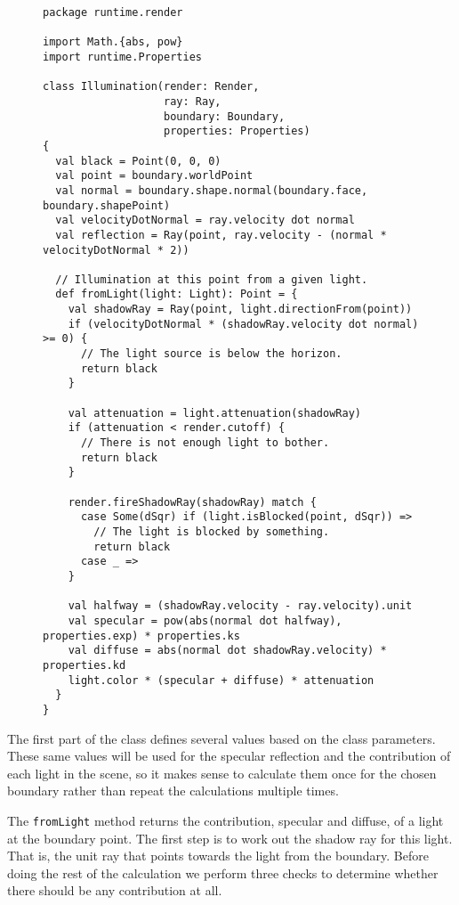 \begin{figure}
\begin{verbatim}
package runtime.render

import Math.{abs, pow}
import runtime.Properties

class Illumination(render: Render,
                   ray: Ray,
                   boundary: Boundary,
                   properties: Properties)
{
  val black = Point(0, 0, 0)
  val point = boundary.worldPoint
  val normal = boundary.shape.normal(boundary.face, boundary.shapePoint)
  val velocityDotNormal = ray.velocity dot normal
  val reflection = Ray(point, ray.velocity - (normal * velocityDotNormal * 2))

  // Illumination at this point from a given light.
  def fromLight(light: Light): Point = {
    val shadowRay = Ray(point, light.directionFrom(point))
    if (velocityDotNormal * (shadowRay.velocity dot normal) >= 0) {
      // The light source is below the horizon.
      return black
    }

    val attenuation = light.attenuation(shadowRay)
    if (attenuation < render.cutoff) {
      // There is not enough light to bother.
      return black
    }

    render.fireShadowRay(shadowRay) match {
      case Some(dSqr) if (light.isBlocked(point, dSqr)) =>
        // The light is blocked by something.
        return black
      case _ =>
    }

    val halfway = (shadowRay.velocity - ray.velocity).unit
    val specular = pow(abs(normal dot halfway), properties.exp) * properties.ks
    val diffuse = abs(normal dot shadowRay.velocity) * properties.kd
    light.color * (specular + diffuse) * attenuation
  }
}
\end{verbatim}
\getcaption
\end{figure}

The first part of the class defines several values based on
the class parameters.
These same values will be used for the specular reflection
and the contribution of each light in the scene,
so it makes sense to calculate them once for the chosen boundary
rather than repeat the calculations multiple times.

The \verb!fromLight! method returns the contribution,
specular and diffuse,
of a light at the boundary point.
The first step is to work out the shadow ray for this light.
That is, the unit ray that points towards the light from the boundary.
Before doing the rest of the calculation we perform three checks
to determine whether there should be any contribution at all.

